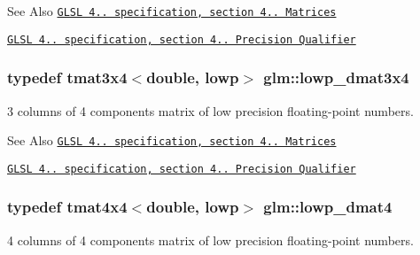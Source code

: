 \begin{DoxySeeAlso}{See Also}
\href{http://www.opengl.org/registry/doc/GLSLangSpec.4.20.8.pdf}{\tt G\-L\-S\-L 4.. specification, section 4.. Matrices} 

\href{http://www.opengl.org/registry/doc/GLSLangSpec.4.20.8.pdf}{\tt G\-L\-S\-L 4.. specification, section 4.. Precision Qualifier} 
\end{DoxySeeAlso}
\hypertarget{group__core__precision_gadbca772b626928af301ea079903ee5d9}{
\subsubsection[{lowp\-\_\-dmat3x4}]{\setlength{\rightskip}{0pt plus 5cm}typedef tmat3x4$<$double, lowp$>$ {\bf glm\-::lowp\-\_\-dmat3x4}}}\label{group__core__precision_gadbca772b626928af301ea079903ee5d9}
3 columns of 4 components matrix of low precision floating-\/point numbers.

\begin{DoxySeeAlso}{See Also}
\href{http://www.opengl.org/registry/doc/GLSLangSpec.4.20.8.pdf}{\tt G\-L\-S\-L 4.. specification, section 4.. Matrices} 

\href{http://www.opengl.org/registry/doc/GLSLangSpec.4.20.8.pdf}{\tt G\-L\-S\-L 4.. specification, section 4.. Precision Qualifier} 
\end{DoxySeeAlso}
\hypertarget{group__core__precision_gafb95042ba1765add225ae138437f860e}{
\subsubsection[{lowp\-\_\-dmat4}]{\setlength{\rightskip}{0pt plus 5cm}typedef tmat4x4$<$double, lowp$>$ {\bf glm\-::lowp\-\_\-dmat4}}}\label{group__core__precision_gafb95042ba1765add225ae138437f860e}
4 columns of 4 components matrix of low precision floating-\/point numbers.


